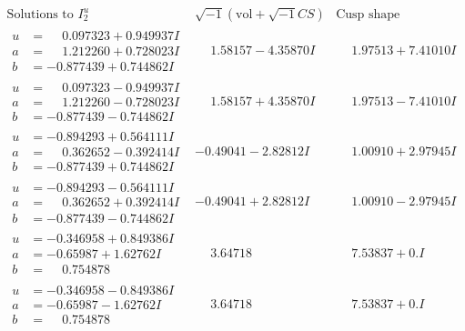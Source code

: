\documentclass[1p]{elsarticle_modified}
\theoremstyle{definition}
\newcommand{\I}{\sqrt{-1}}
\begin{document}
$$\begin{array}{c|c|c}  
\text{Solutions to }I^u_{2}& \I (\text{vol} + \sqrt{-1}CS) & \text{Cusp shape}\\
 \hline 
\begin{aligned}
u &= \phantom{-}0.097323 + 0.949937 I \\
a &= \phantom{-}1.212260 + 0.728023 I \\
b &= -0.877439 + 0.744862 I\end{aligned}
 & \phantom{-}1.58157 - 4.35870 I & \phantom{-}1.97513 + 7.41010 I \\ \hline\begin{aligned}
u &= \phantom{-}0.097323 - 0.949937 I \\
a &= \phantom{-}1.212260 - 0.728023 I \\
b &= -0.877439 - 0.744862 I\end{aligned}
 & \phantom{-}1.58157 + 4.35870 I & \phantom{-}1.97513 - 7.41010 I \\ \hline\begin{aligned}
u &= -0.894293 + 0.564111 I \\
a &= \phantom{-}0.362652 - 0.392414 I \\
b &= -0.877439 + 0.744862 I\end{aligned}
 & -0.49041 - 2.82812 I & \phantom{-}1.00910 + 2.97945 I \\ \hline\begin{aligned}
u &= -0.894293 - 0.564111 I \\
a &= \phantom{-}0.362652 + 0.392414 I \\
b &= -0.877439 - 0.744862 I\end{aligned}
 & -0.49041 + 2.82812 I & \phantom{-}1.00910 - 2.97945 I \\ \hline\begin{aligned}
u &= -0.346958 + 0.849386 I \\
a &= -0.65987 + 1.62762 I \\
b &= \phantom{-}0.754878\phantom{ +0.000000I}\end{aligned}
 & \phantom{-}3.64718\phantom{ +0.000000I} & \phantom{-}7.53837 + 0. I\phantom{ +0.000000I} \\ \hline\begin{aligned}
u &= -0.346958 - 0.849386 I \\
a &= -0.65987 - 1.62762 I \\
b &= \phantom{-}0.754878\phantom{ +0.000000I}\end{aligned}
 & \phantom{-}3.64718\phantom{ +0.000000I} & \phantom{-}7.53837 + 0. I\phantom{ +0.000000I} \\ \hline\begin{aligned}

\end{aligned}
\end{array}$$
\end{document}
